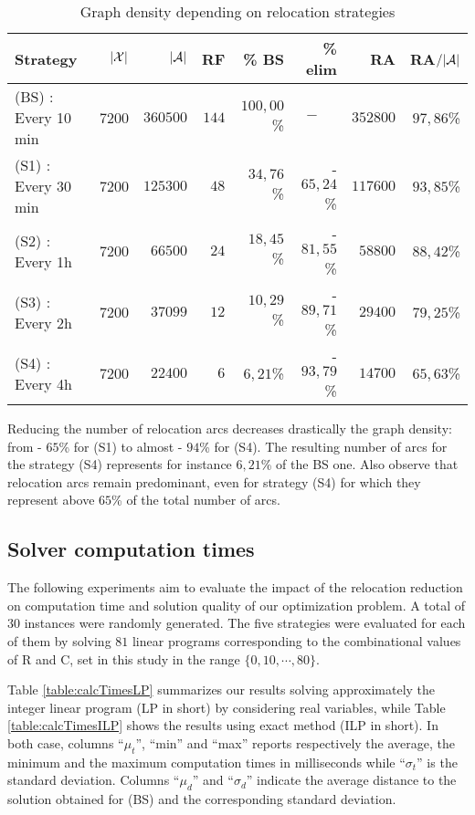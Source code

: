 \begin{bibunit}[ieeetr]
\begin{table}[h]
\caption{Graph density depending on relocation strategies}
\label{table:graphDensity}
\centering
\begin{tabularx}{\linewidth}{@{\extracolsep{\fill}}lrrrrrrr@{}}
\hline
Strategy  & $|\mathcal{X}|$ & $|\mathcal{A}|$  &    RF & \% BS &      \% elim &       RA &    RA$/|{\cal A}|$ \\
\hline
(BS) : Every 10 min  &         7200 &      $360500$ & $144$ &    $100,00$\% &   $-~~~~~~$ & $352800$ & $97,86$\% \\
(S1) : Every 30 min  &         7200 &      $125300$ &  $48$ &     $34,76$\% & - $65,24$\% & $117600$ & $93,85$\% \\
(S2) : Every 1h      &         7200 &       $66500$ &  $24$ &     $18,45$\% & - $81,55$\% &  $58800$ & $88,42$\% \\
(S3) : Every 2h      &         7200 &       $37099$ &  $12$ &     $10,29$\% & - $89,71$\% &  $29400$ & $79,25$\% \\
(S4) : Every 4h      &         7200 &       $22400$ &   $6$ &      $6,21$\% & - $93,79$\% &  $14700$ & $65,63$\% \\
\hline
\end{tabularx}
\end{table}

Reducing the number of relocation arcs decreases drastically the graph density: from - $65$\% for (S1) to almost - $94$\% for (S4).
The resulting number of arcs for the strategy (S4) represents for instance $6,21$\% of the BS one.
Also observe that relocation arcs remain predominant, even for strategy (S4) for which they represent above $65$\% of the total number of arcs.

\subsection{Solver computation times}
The following experiments aim to evaluate the impact of the relocation reduction on computation time and solution quality of our optimization problem.
A total of $30$ instances were randomly generated.
The five strategies were evaluated for each of them by solving $81$ linear programs corresponding to the combinational values of R and C, set in this study in the range $\{0,10,\cdots ,80\}$.

Table \ref{table:calcTimesLP} summarizes our results solving approximately the integer linear program (LP in short) by considering real variables, while Table \ref{table:calcTimesILP} shows the results using exact method (ILP in short).
In both case, columns ``$\mu_t$'', ``min'' and ``max'' reports respectively the average, the minimum and the maximum computation times in milliseconds while ``$\sigma_t$'' is the standard deviation.
Columns ``$\mu_d$'' and  ``$\sigma_d$'' indicate the average distance to the solution obtained for (BS) and the corresponding standard deviation.


\end{bibunit}
